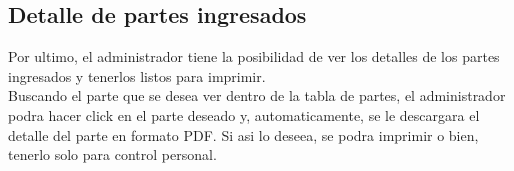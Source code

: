 \documentclass[12pt,a4paper]{article}
\begin{document}
\subsection{Detalle de partes ingresados}
Por ultimo, el administrador tiene la posibilidad de ver los detalles de los partes ingresados y tenerlos listos para imprimir. \\
Buscando el parte que se desea ver dentro de la tabla de partes, el administrador podra hacer click en el parte deseado y, automaticamente, se le descargara el detalle del parte en formato PDF. Si asi lo deseea, se podra imprimir o bien, tenerlo solo para control personal.
\end{document}
